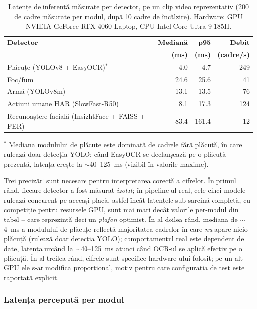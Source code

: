 \documentclass[../../main.tex]{subfiles}
\begin{document}
\begin{table}[h]
\centering
\caption{Latențe de inferență măsurate per detector, pe un clip video reprezentativ (200 de cadre măsurate per modul, după 10 cadre de încălzire). Hardware: GPU NVIDIA GeForce RTX 4060 Laptop, CPU Intel Core Ultra 9 185H.}
\label{tab:latente_inferenta}
\small
\begin{tabular}{p{6.6cm}rrr}
\hline
\textbf{Detector} & \textbf{Mediană} & \textbf{p95} & \textbf{Debit} \\
 & \textbf{(ms)} & \textbf{(ms)} & \textbf{(cadre/s)} \\
\hline
Plăcuțe (YOLOv8 + EasyOCR)$^{*}$ & 4.0 & 4.7 & 249 \\
Foc/fum & 24.6 & 25.6 & 41 \\
Armă (YOLOv8m) & 13.1 & 13.5 & 76 \\
Acțiuni umane HAR (SlowFast-R50) & 8.1 & 17.3 & 124 \\
Recunoaștere facială (InsightFace + FAISS + FER) & 83.4 & 161.4 & 12 \\
\hline
\end{tabular}
\normalsize

\vspace{3pt}
{\footnotesize $^{*}$ Mediana modulului de plăcuțe este dominată de cadrele fără plăcuță, în care rulează doar detecția YOLO; când EasyOCR se declanșează pe o plăcuță prezentă, latența crește la $\sim$40--125~ms (vizibil în valorile maxime).}
\end{table}

Trei precizări sunt necesare pentru interpretarea corectă a cifrelor. În primul rând, fiecare detector a fost măsurat \emph{izolat}; în pipeline-ul real, cele cinci modele rulează concurent pe aceeași placă, astfel încât latențele sub sarcină completă, cu competiție pentru resursele GPU, sunt mai mari decât valorile per-modul din tabel -- care reprezintă deci un \emph{plafon} optimist. În al doilea rând, mediana de $\sim$4~ms a modulului de plăcuțe reflectă majoritatea cadrelor în care \emph{nu} apare nicio plăcuță (rulează doar detecția YOLO); comportamentul real este dependent de date, latența urcând la $\sim$40--125~ms atunci când OCR-ul se aplică efectiv pe o plăcuță. În al treilea rând, cifrele sunt specifice hardware-ului folosit; pe un alt GPU ele s-ar modifica proporțional, motiv pentru care configurația de test este raportată explicit.

\subsubsection{Latența percepută per modul}
\end{document}
